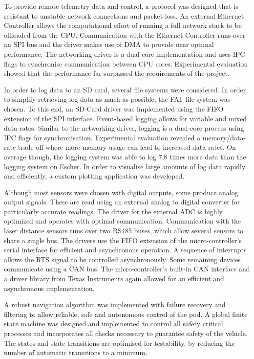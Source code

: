 
To provide remote telemetry data and control, a protocol was designed that is resistant to unstable network connections and packet loss. An external Ethernet Controller allows the computational effort of running a full network stack to be offloaded from the CPU. Communication with the Ethernet Controller runs over an SPI bus and the driver makes use of DMA to provide near optimal performance. The networking driver is a dual-core implementation and uses IPC flags to synchronise communication between CPU cores. Experimental evaluation showed that the performance far surpassed the requirements of the project.


In order to log data to an SD card, several file systems were considered. In order to simplify retrieving log data as much as possible, the FAT file system was chosen. To this end, an SD-Card driver was implemented using the FIFO extension of the SPI interface. Event-based logging allows for variable and mixed data-rates. Similar to the networking driver, logging is a dual-core process using IPC flags for synchronisation. Experimental evaluation revealed a memory/data-rate trade-off where more memory usage can lead to increased data-rates. On average though, the logging system was able to log 7,8 times more data than the logging system on Escher. In order to visualise large amounts of log data rapidly and efficiently, a custom plotting application was developed.


Although most sensors were chosen with digital outputs, some produce analog output signals. These are read using an external analog to digital converter for particularly accurate readings. The driver for the external ADC is highly optimized and operates with optimal communication. Communication with the laser distance sensors runs over two RS485 buses, which allow several sensors to share a single bus. The drivers use the FIFO extension of the micro-controller's serial interface for efficient and asynchronous operation. A sequence of interrupts allows the RTS signal to be controlled asynchronously. Some remaining devices communicate using a CAN bus. The micro-controller's built-in CAN interface and a driver library from Texas Instruments again allowed for an efficient and asynchronous implementation.


A robust navigation algorithm was implemented with failure recovery and filtering to allow reliable, safe and autonomous control of the pod. A global finite state machine was designed and implemented to control all safety critical processes and incorporates all checks necessary to guarantee safety of the vehicle. The states and state transitions are optimised for testability, by reducing the number of automatic transitions to a minimum.

